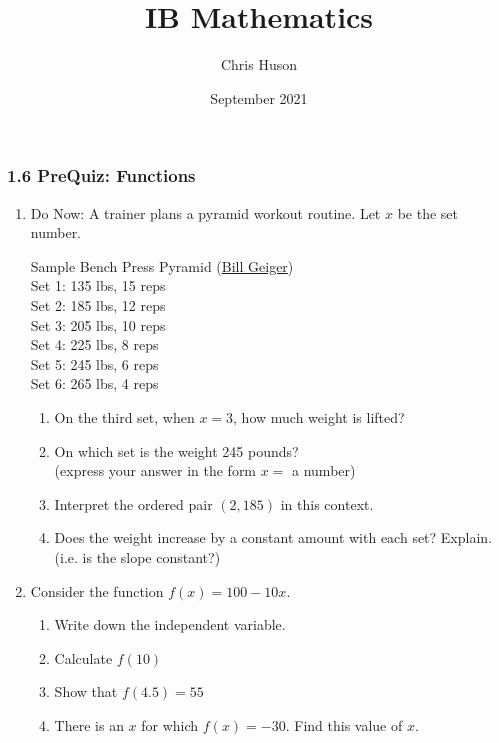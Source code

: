\documentclass[12pt, twoside]{article}
\title{IB Mathematics}
\author{Chris Huson}
\date{September 2021}
\begin{document}
\subsubsection*{1.6 PreQuiz: Functions}
\begin{enumerate}
  \item Do Now: A trainer plans a pyramid workout routine. Let $x$ be the set number.
  \begin{center}
      Sample Bench Press Pyramid 
      (\href{https://www.bodybuilding.com/content/build-muscle-and-strength-with-pyramid-training.html}{Bill Geiger})\\
        Set 1: 135 lbs, 15 reps\\
        Set 2: 185 lbs, 12 reps\\
        Set 3: 205 lbs, 10 reps\\
        Set 4: 225 lbs, 8 reps\\
        Set 5: 245 lbs, 6 reps\\
        Set 6: 265 lbs, 4 reps
  \end{center}
\begin{enumerate}[itemsep=0.5cm]
  \item On the third set, when $x=3$, how much weight is lifted?
  \item On which set is the weight 245 pounds? \\(express your answer in the form $x=$ a number)
  \item Interpret the ordered pair $(2,185)$ in this context.\vspace{2cm}
  \item Does the weight increase by a constant amount with each set? Explain. \\(i.e. is the slope constant?) \vspace{1cm}
\end{enumerate}

\item Consider the function $f(x)=100 - 10x$.
\begin{enumerate}[itemsep=0.5cm]
  \item Write down the independent variable.
  \item Calculate $f(10)$ \vspace{1cm}
  \item Show that $f(4.5)=55$ \vspace{1.5cm}
  \item There is an $x$ for which $f(x)= -30$. Find this value of $x$.
\end{enumerate} \vspace{2cm}


\end{enumerate}
\end{document}
